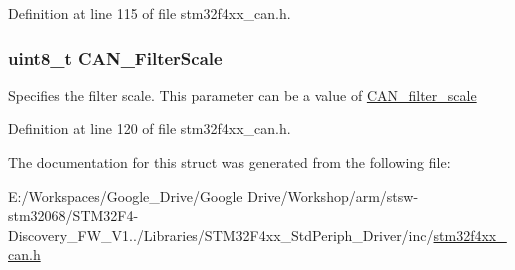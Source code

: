 Definition at line 115 of file stm32f4xx\-\_\-can.\-h.

\hypertarget{struct_c_a_n___filter_init_type_def_a434a665b1a2781348818d285dd18b6d5}{
\subsubsection[{C\-A\-N\-\_\-\-Filter\-Scale}]{\setlength{\rightskip}{0pt plus 5cm}uint8\-\_\-t C\-A\-N\-\_\-\-Filter\-Scale}}\label{struct_c_a_n___filter_init_type_def_a434a665b1a2781348818d285dd18b6d5}
Specifies the filter scale. This parameter can be a value of \hyperlink{group___c_a_n__filter__scale}{C\-A\-N\-\_\-filter\-\_\-scale} 

Definition at line 120 of file stm32f4xx\-\_\-can.\-h.



The documentation for this struct was generated from the following file\-:\begin{DoxyCompactItemize}
\item 
E\-:/\-Workspaces/\-Google\-\_\-\-Drive/\-Google Drive/\-Workshop/arm/stsw-\/stm32068/\-S\-T\-M32\-F4-\/\-Discovery\-\_\-\-F\-W\-\_\-\-V1../\-Libraries/\-S\-T\-M32\-F4xx\-\_\-\-Std\-Periph\-\_\-\-Driver/inc/\hyperlink{stm32f4xx__can_8h}{stm32f4xx\-\_\-can.\-h}\end{DoxyCompactItemize}
